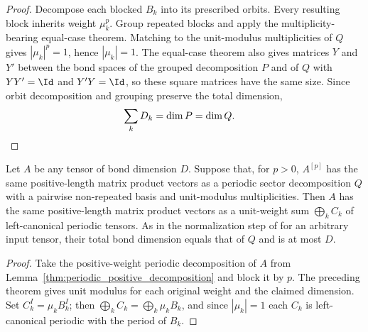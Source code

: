 \begin{proof}
    \leanok
    Decompose each blocked $B_k$ into its prescribed orbits. Every resulting
    block inherits weight $\mu_k^p$. Group repeated blocks and apply the
    multiplicity-bearing equal-case theorem. Matching to the unit-modulus
    multiplicities of $Q$ gives $|\mu_k|^p=1$, hence $|\mu_k|=1$.
    The equal-case theorem also gives matrices $Y$ and $Y'$ between the bond
    spaces of the grouped decomposition $P$ and of $Q$ with $YY'=\Id$ and
    $Y'Y=\Id$, so these square matrices have the same size. Since orbit
    decomposition and grouping preserve the total dimension,
    \begin{align}
        \sum_kD_k & =\dim P=\dim Q. \notag
    \end{align}
\end{proof}

\begin{lemma}
    \label{thm:periodic_refinement_normalized_presentation}
    \leanok
    Let $A$ be any tensor of bond dimension $D$. Suppose that, for $p>0$,
    $A^{[p]}$ has the same positive-length matrix product vectors as a periodic
    sector decomposition $Q$ with a pairwise non-repeated basis and
    unit-modulus multiplicities. Then $A$ has the same positive-length matrix
    product vectors as a unit-weight sum $\bigoplus_k C_k$ of left-canonical
    periodic tensors. As in the normalization step of
    \cite[Theorem~4.1, lines~750--756]{DeLasCuevas2017Irreducible} for an
    arbitrary input tensor, their total bond dimension equals that of $Q$ and
    is at most $D$.
\end{lemma}

\begin{proof}
    \leanok
    Take the positive-weight periodic decomposition of $A$ from
    Lemma~\ref{thm:periodic_positive_decomposition} and block it by $p$.
    The preceding theorem gives unit modulus for each original weight and
    the claimed dimension. Set $C_k^I=\mu_kB_k^I$; then
    $\bigoplus_kC_k=\bigoplus_k\mu_kB_k$, and since $|\mu_k|=1$ each $C_k$ is
    left-canonical periodic with the period of $B_k$.
\end{proof}

